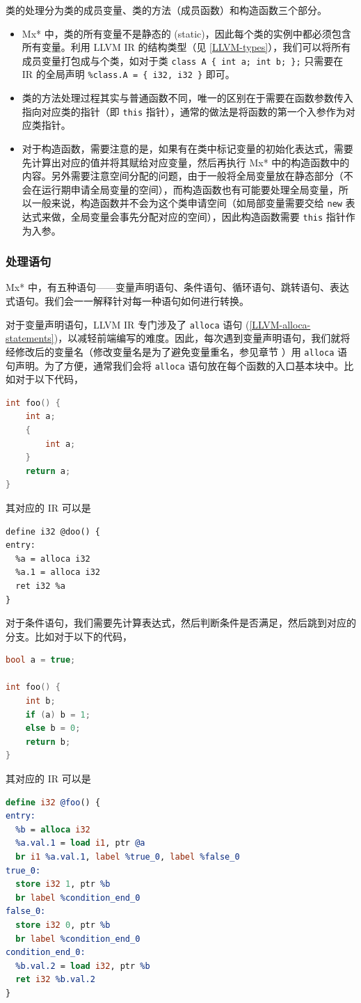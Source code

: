 类的处理分为类的成员变量、类的方法（成员函数）和构造函数三个部分。
\begin{itemize}
  \item Mx* 中，类的所有变量不是静态的
    (static)，因此每个类的实例中都必须包含所有变量。利用 LLVM IR 的结构类型（见
    \ref{LLVM-types}），我们可以将所有成员变量打包成与个类，如对于类
    \texttt{class A \{ int a; int b; \};}
    只需要在 IR 的全局声明 \texttt{\%class.A = \{ i32, i32 \}}
    即可。
  \item 类的方法处理过程其实与普通函数不同，唯一的区别在于需要在函数参数传入指向对应类的指针（即
    \texttt{this} 指针），通常的做法是将函数的第一个入参作为对应类指针。
  \item 对于构造函数，需要注意的是，如果有在类中标记变量的初始化表达式，需要先计算出对应的值并将其赋给对应变量，然后再执行
    Mx* 中的构造函数中的内容。另外需要注意空间分配的问题，由于一般将全局变量放在静态部分（不会在运行期申请全局变量的空间），而构造函数也有可能要处理全局变量，所以一般来说，构造函数并不会为这个类申请空间（如局部变量需要交给
    \texttt{new} 表达式来做，全局变量会事先分配对应的空间），因此构造函数需要
    \texttt{this} 指针作为入参。
\end{itemize}

\subsubsection{处理语句}\label{AST-to-IR-statements}

Mx* 中，有五种语句——变量声明语句、条件语句、循环语句、跳转语句、表达式语句。我们会一一解释针对每一种语句如何进行转换。

对于变量声明语句，LLVM IR 专门涉及了 \texttt{alloca} 语句
(\ref{LLVM-alloca-statements})，以减轻前端编写的难度。因此，每次遇到变量声明语句，我们就将经修改后的变量名（修改变量名是为了避免变量重名，参见章节
\label{AST-to-IR-naming}）用 \texttt{alloca} 语句声明。为了方便，通常我们会将
\texttt{alloca} 语句放在每个函数的入口基本块中。比如对于以下代码，
\begin{lstlisting}[language=C++]
int foo() {
    int a;
    {
        int a;
    }
    return a;
}
\end{lstlisting}
其对应的 IR 可以是
\begin{lstlisting}
define i32 @doo() {
entry:
  %a = alloca i32
  %a.1 = alloca i32
  ret i32 %a
}
\end{lstlisting}

对于条件语句，我们需要先计算表达式，然后判断条件是否满足，然后跳到对应的分支。比如对于以下的代码，
\begin{lstlisting}[language=C++]
bool a = true;

int foo() {
    int b;
    if (a) b = 1;
    else b = 0;
    return b;
}
\end{lstlisting}
其对应的 IR 可以是
\begin{lstlisting}[language=LLVM]
define i32 @foo() {
entry:
  %b = alloca i32
  %a.val.1 = load i1, ptr @a
  br i1 %a.val.1, label %true_0, label %false_0
true_0:
  store i32 1, ptr %b
  br label %condition_end_0
false_0:
  store i32 0, ptr %b
  br label %condition_end_0
condition_end_0:
  %b.val.2 = load i32, ptr %b
  ret i32 %b.val.2
}
\end{lstlisting}

